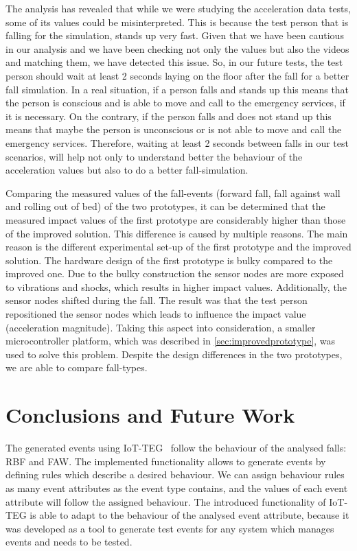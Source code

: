 \documentclass[journal]{IEEEtran}
\begin{document}
The analysis has revealed that while we were studying the acceleration data tests, some of its values could be misinterpreted.
This is because the test person that is falling for the simulation, stands up very fast. Given that we have been cautious
in our analysis and we have been checking not only the values but also the videos and matching them, we have detected
this issue. So, in our future tests, the test person should wait at least 2 seconds laying on the floor 
after the fall for a better fall simulation. In a real situation, if a
person falls and stands up this means that the person
is conscious and is able to move and call to the emergency services, if it is necessary. On the contrary, if the person
falls and does not stand up this means that maybe the person is unconscious or is not able to move and call the emergency
services. Therefore, waiting at least 2 seconds between falls in our test scenarios, will help not only to understand 
better the behaviour of the acceleration values but also to do a better fall-simulation.

Comparing the measured values of the fall-events (forward fall, fall against wall and rolling out of bed) of the two 
prototypes, it can be determined that the measured impact values of the first prototype are considerably higher than 
those of the improved solution. This difference is caused by multiple reasons. The main reason is the different 
experimental set-up of the first prototype and the improved solution. The hardware design of the first prototype is 
bulky compared to the improved one. Due to the bulky construction the sensor nodes are more exposed to vibrations and 
shocks, which results in higher impact values. Additionally, the sensor nodes shifted during the fall. The result was 
that the test person repositioned the sensor nodes which leads to influence the impact value (acceleration magnitude). 
Taking this aspect into consideration, a smaller microcontroller
platform, which was described in \ref{sec:improvedprototype}, was used
to solve this problem. Despite the design differences in the two
prototypes,  
we are able to compare fall-types.

\section{Conclusions and Future Work}
\label{sec:conclusions}

The generated events using IoT-TEG~\cite{TesisGutierrez2017,Gutierrez2017} follow the behaviour of the analysed falls: 
RBF and FAW. The implemented functionality 
allows to generate events by defining rules which describe a desired behaviour. We can assign behaviour rules as many 
event attributes as the event type contains, and the values of each event attribute will follow the assigned behaviour.
The introduced functionality of IoT-TEG is able to adapt to the behaviour of the analysed event attribute, because
it was developed as a tool to generate test events for any system
which manages events and needs to be tested.
\end{document}
